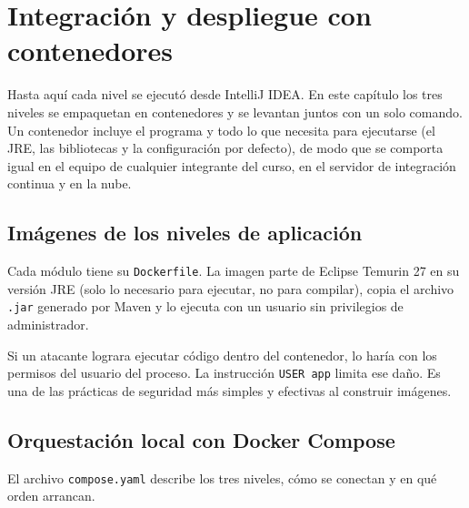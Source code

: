 \chapter{Integración y despliegue con contenedores}\label{cap:despliegue}

Hasta aquí cada nivel se ejecutó desde IntelliJ IDEA. En este capítulo los tres niveles se empaquetan en contenedores y se levantan juntos con un solo comando. Un contenedor incluye el programa y todo lo que necesita para ejecutarse (el JRE, las bibliotecas y la configuración por defecto), de modo que se comporta igual en el equipo de cualquier integrante del curso, en el servidor de integración continua y en la nube.

\section{Imágenes de los niveles de aplicación}

Cada módulo tiene su \texttt{Dockerfile}. La imagen parte de Eclipse Temurin 27 en su versión JRE (solo lo necesario para ejecutar, no para compilar), copia el archivo \texttt{.jar} generado por Maven y lo ejecuta con un usuario sin privilegios de administrador.



\begin{infoBox}[title={¿Por qué un usuario sin privilegios?}]
	Si un atacante lograra ejecutar código dentro del contenedor, lo haría con los permisos del usuario del proceso. La instrucción \texttt{USER app} limita ese daño. Es una de las prácticas de seguridad más simples y efectivas al construir imágenes.
\end{infoBox}

\section{Orquestación local con Docker Compose}

El archivo \texttt{compose.yaml} describe los tres niveles, cómo se conectan y en qué orden arrancan.



